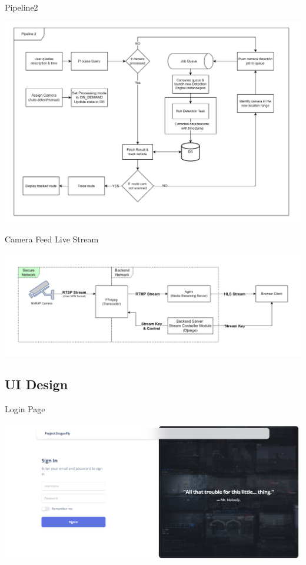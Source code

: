 \documentclass{beamer}
\begin{document}
	\begin{frame}{Pipeline2}
		\begin{center}
			\includegraphics[width=\linewidth]{res/pipeline2}
		\end{center}
	\end{frame}

	\begin{frame}{Camera Feed Live Stream}
		\begin{center}
			\includegraphics[width=\linewidth]{res/live_stream_arch.jpg}
		\end{center}
	\end{frame}
		
	\subsection{UI Design}
	\begin{frame}{Login Page}
		\begin{center}
			 \includegraphics[width=\linewidth]{res/login.png}
		\end{center}
 	\end{frame}
	 
\end{document}
